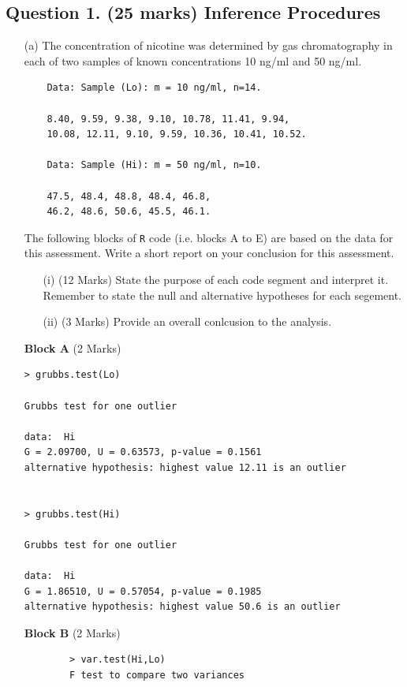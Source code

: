 \documentclass[a4paper,12pt]{article}
\begin{document}
\subsection*{Question 1. (25 marks) Inference Procedures}\label{sec:question-1.-(25-marks)-inference-procedures-and-distributional-testing}
	
\begin{itemize}
	\item[(a)]
 The concentration of nicotine was determined by gas chromatography in each of two samples of known concentrations 10 ng/ml and 50 ng/ml.
\begin{framed}
	\begin{verbatim}
	Data: Sample (Lo): m = 10 ng/ml, n=14.
	
	8.40, 9.59, 9.38, 9.10, 10.78, 11.41, 9.94, 
	10.08, 12.11, 9.10, 9.59, 10.36, 10.41, 10.52.
	
	Data: Sample (Hi): m = 50 ng/ml, n=10.
	
	47.5, 48.4, 48.8, 48.4, 46.8, 
	46.2, 48.6, 50.6, 45.5, 46.1.
	\end{verbatim}
\end{framed}


\noindent The following blocks of \texttt{R} code (i.e. blocks A to E) are based on the data for this assessment. Write a short report on your conclusion for this assessment. 

\begin{itemize}
	\item[(i)] (12 Marks) State the purpose of each code segment and interpret it. Remember to state the null and alternative hypotheses for each segement.
	\item[(ii)] (3 Marks) Provide an overall conlcusion to the analysis.
\end{itemize}




\noindent \textbf{Block A} (2 Marks)
\begin{framed}
\begin{verbatim}
> grubbs.test(Lo)

Grubbs test for one outlier

data:  Hi
G = 2.09700, U = 0.63573, p-value = 0.1561
alternative hypothesis: highest value 12.11 is an outlier


> grubbs.test(Hi)

Grubbs test for one outlier

data:  Hi
G = 1.86510, U = 0.57054, p-value = 0.1985
alternative hypothesis: highest value 50.6 is an outlier
\end{verbatim}
\end{framed}	
\noindent \textbf{Block B} (2 Marks)
	\begin{framed}
		\begin{verbatim}
		> var.test(Hi,Lo)
		F test to compare two variances
		

\end{verbatim}
\end{framed}
\end{itemize}
\end{document}

